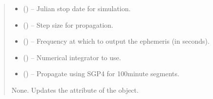 \documentclass[letterpaper,10pt,english]{sphinxmanual}
\begin{document}
\begin{fulllineitems}
\begin{fulllineitems}
\begin{quote}
\begin{description}
\begin{itemize}
\item {} 
\sphinxAtStartPar
{} () – Julian stop date for simulation.

\item {} 
\sphinxAtStartPar
{} () – Step size for propagation.

\item {} 
\sphinxAtStartPar
{} () – Frequency at which to output the ephemeris (in seconds).

\item {} 
\sphinxAtStartPar
{} () – Numerical integrator to use.

\item {} 
\sphinxAtStartPar
{} () – Propagate using SGP4 for 100\sphinxhyphen{}minute segments.

\end{itemize}

\sphinxAtStartPar
None. Updates the  attribute of the object.

\end{description}\end{quote}

\end{fulllineitems}


\end{fulllineitems}

\end{document}
